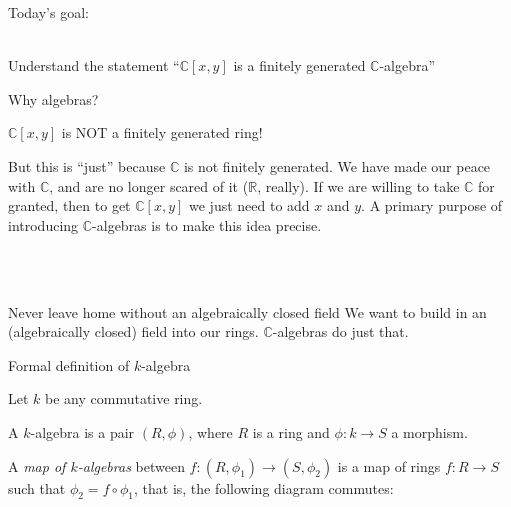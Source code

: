 \documentclass{beamer}
\newcommand{\C}{\mathbb{C}}
\newcommand{\R}{\mathbb{R}}
\begin{document}
\begin{frame}[plain, c]

\huge
\begin{center}


{ Today's goal: \\~\\}

Understand the statement ``$\C[x,y]$ is a finitely generated $\C$-algebra''

\end{center}
\end{frame}



\begin{frame}{Why algebras?}

\begin{block}{$\C[x,y]$ is \alert{NOT} a finitely generated ring!}


But this is ``just'' because $\C$ is not finitely generated.  We have made our peace with $\C$, and are no longer scared of it ($\R$, really).  If we are willing to take $\C$ for granted, then to get $\C[x,y]$ we just need to add $x$ and $y$. A primary purpose of introducing $\C$-algebras is to make this idea precise.  
\end{block}\\~\\
\begin{block}{Never leave home without an algebraically closed field} 
We want to build in an (algebraically closed) field into our rings. $\C$-algebras do just that.
\end{block}

 
\end{frame}

\begin{frame}[fragile]{Formal definition of $k$-algebra}

Let $k$ be any commutative ring. 

\begin{definition} A $k$-algebra is a pair $(R,\phi)$, where $R$ is a ring and $\phi:k\to S$ a morphism.
\end{definition}


\begin{definition} A \emph{map of $k$-algebras} between $f:(R,\phi_1)\to (S,\phi_2)$ is a map of rings $f:R\to S$ such that $\phi_2=f\circ\phi_1$, that is, the following diagram commutes:
\begin{center}
\end{center}



\end{definition}








\end{frame}
\end{document}
